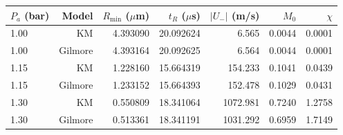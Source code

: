 \begin{tabular}{lrrrrrr}\toprule
$P_a$ (bar) & Model & $R_{\min}$ ($\mu$m) & $t_R$ ($\mu$s) & $|U_-|$ (m/s) & $M_0$ & $\chi$ \\ \midrule
1.00 & KM & 4.393090 & 20.092624 & 6.565 & 0.0044 & 0.0001 \\
1.00 & Gilmore & 4.393164 & 20.092625 & 6.564 & 0.0044 & 0.0001 \\
1.15 & KM & 1.228160 & 15.664319 & 154.233 & 0.1041 & 0.0439 \\
1.15 & Gilmore & 1.233152 & 15.664393 & 152.478 & 0.1029 & 0.0431 \\
1.30 & KM & 0.550809 & 18.341064 & 1072.981 & 0.7240 & 1.2758 \\
1.30 & Gilmore & 0.513361 & 18.341191 & 1031.292 & 0.6959 & 1.7149 \\
\bottomrule\end{tabular}
